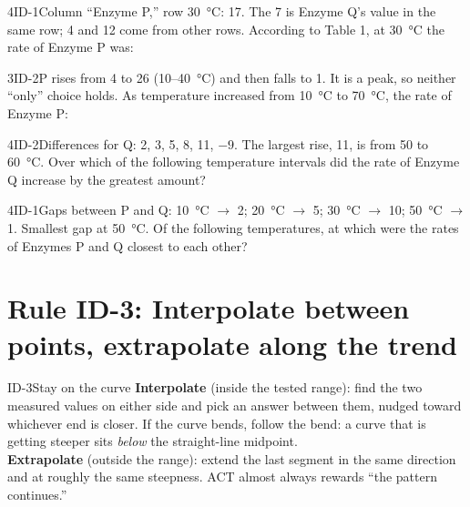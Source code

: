 \documentclass[11pt]{article}
\begin{document}
\begin{q}{4}{ID-1}{Column ``Enzyme P,'' row \SI{30}{\celsius}: 17. The 7 is Enzyme Q's value in the same row; 4 and 12 come from other rows.}
According to Table 1, at \SI{30}{\celsius} the rate of Enzyme P was:
\choicesrow{4 \si{\micro\mole\per\minute}}{7 \si{\micro\mole\per\minute}}{12 \si{\micro\mole\per\minute}}{17 \si{\micro\mole\per\minute}}
\end{q}

\begin{q}{3}{ID-2}{P rises from 4 to 26 (10--\SI{40}{\celsius}) and then falls to 1. It is a peak, so neither ``only'' choice holds.}
As temperature increased from \SI{10}{\celsius} to \SI{70}{\celsius}, the rate of Enzyme P:
\end{q}

\begin{q}{4}{ID-2}{Differences for Q: 2, 3, 5, 8, 11, $-9$. The largest rise, 11, is from 50 to \SI{60}{\celsius}.}
Over which of the following temperature intervals did the rate of Enzyme Q increase by the greatest amount?
\end{q}

\begin{q}{4}{ID-1}{Gaps between P and Q: \SI{10}{\celsius} $\to$ 2; \SI{20}{\celsius} $\to$ 5; \SI{30}{\celsius} $\to$ 10; \SI{50}{\celsius} $\to$ 1. Smallest gap at \SI{50}{\celsius}.}
Of the following temperatures, at which were the rates of Enzymes P and Q closest to each other?
\end{q}

\section{Rule ID-3: Interpolate between points, extrapolate along the trend}

\begin{rulebox}{ID-3}{Stay on the curve}
\textbf{Interpolate} (inside the tested range): find the two measured values on either side and pick an answer between them, nudged toward whichever end is closer. If the curve bends, follow the bend: a curve that is getting steeper sits \emph{below} the straight-line midpoint.\\
\textbf{Extrapolate} (outside the range): extend the last segment in the same direction and at roughly the same steepness. ACT almost always rewards ``the pattern continues.''
\end{rulebox}
\end{document}
